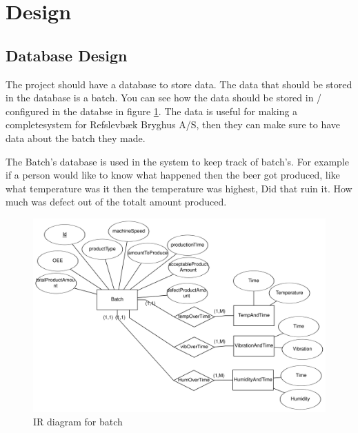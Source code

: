 \section{Design}

\subsection{Database Design}
The project should have a database to store data. 
The data that should be stored in the database is a batch. 
You can see how the data should be stored in / 
configured in the databse in figure \ref{figure:eer_diagram_batch}.
The data is useful for making a completesystem for Refslevbæk Bryghus A/S, 
then they can make sure to have data about the batch they made. 

The Batch's database is used in the system to keep track of batch's.
For example if a person would like to know what happened then the beer got produced,
like what temperature was it then the temperature was highest, Did that ruin it.
How much was defect out of the totalt amount produced. 

\begin{figure}[ht]
\centering 
\includegraphics[width=0.8\linewidth]{images/eer_diagrams/database_EER_batch.png}
\caption{IR diagram for batch} 
\label{figure:eer_diagram_batch}
\end{figure}
